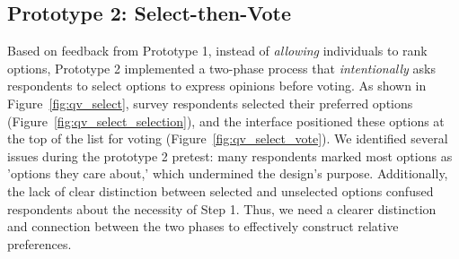 \subsection{Prototype 2: Select-then-Vote}
Based on feedback from Prototype 1, instead of \textit{allowing} individuals to rank options, Prototype 2 implemented a two-phase process that \textit{intentionally} asks respondents to select options to express opinions before voting. As shown in Figure~\ref{fig:qv_select}, survey respondents selected their preferred options (Figure~\ref{fig:qv_select_selection}), and the interface positioned these options at the top of the list for voting (Figure~\ref{fig:qv_select_vote}). We identified several issues during the prototype 2 pretest: many respondents marked most options as 'options they care about,' which undermined the design's purpose. Additionally, the lack of clear distinction between selected and unselected options confused respondents about the necessity of Step 1. Thus, we need a clearer distinction and connection between the two phases to effectively construct relative preferences.

